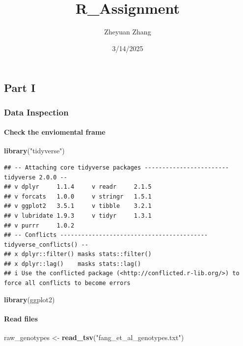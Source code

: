 \documentclass[
]{article}
\title{R\_Assignment}
\author{Zheyuan Zhang}
\date{3/14/2025}
\newenvironment{Shaded}{\begin{snugshade}}{\end{snugshade}}
\newcommand{\FunctionTok}[1]{\textcolor[rgb]{0.13,0.29,0.53}{\textbf{#1}}}
\newcommand{\NormalTok}[1]{#1}
\newcommand{\OtherTok}[1]{\textcolor[rgb]{0.56,0.35,0.01}{#1}}
\newcommand{\StringTok}[1]{\textcolor[rgb]{0.31,0.60,0.02}{#1}}
\begin{document}
\maketitle

\subsection{Part I}\label{part-i}

\subsubsection{Data Inspection}\label{data-inspection}

\paragraph{Check the enviomental
frame}\label{check-the-enviomental-frame}

\begin{Shaded}
\begin{Highlighting}[]
\FunctionTok{library}\NormalTok{(}\StringTok{"tidyverse"}\NormalTok{)}
\end{Highlighting}
\end{Shaded}

\begin{verbatim}
## -- Attaching core tidyverse packages ------------------------ tidyverse 2.0.0 --
## v dplyr     1.1.4     v readr     2.1.5
## v forcats   1.0.0     v stringr   1.5.1
## v ggplot2   3.5.1     v tibble    3.2.1
## v lubridate 1.9.3     v tidyr     1.3.1
## v purrr     1.0.2     
## -- Conflicts ------------------------------------------ tidyverse_conflicts() --
## x dplyr::filter() masks stats::filter()
## x dplyr::lag()    masks stats::lag()
## i Use the conflicted package (<http://conflicted.r-lib.org/>) to force all conflicts to become errors
\end{verbatim}

\begin{Shaded}
\begin{Highlighting}[]
\FunctionTok{library}\NormalTok{(ggplot2)}
\end{Highlighting}
\end{Shaded}

\paragraph{Read files}\label{read-files}

\begin{Shaded}
\begin{Highlighting}[]
\NormalTok{raw\_genotypes }\OtherTok{\textless{}{-}} \FunctionTok{read\_tsv}\NormalTok{(}\StringTok{"fang\_et\_al\_genotypes.txt"}\NormalTok{)}
\end{Highlighting}
\end{Shaded}
\end{document}

